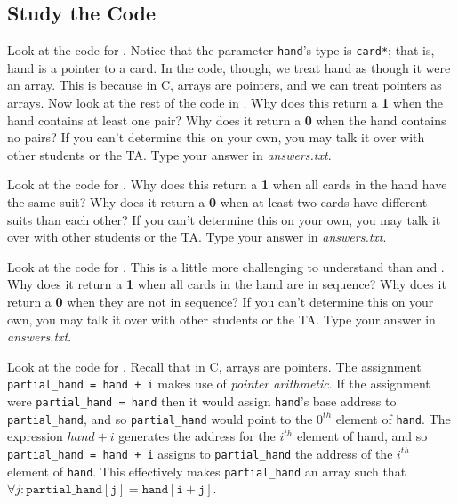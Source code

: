 \subsection{Study the Code} \label{subsec:studythecode}

Look at the code for .
Notice that the parameter \lstinline{hand}'s type is \lstinline{card*}; that is, \lstinline{}{hand} is a pointer to a \lstinline{}{card}.
In the code, though, we treat \lstinline{}{hand} as though it were an array.
This is because in C, arrays are pointers, and we can treat pointers as arrays.
Now look at the rest of the code in .
Why does this return a \textbf{1} when the hand contains at least one pair?
Why does it return a \textbf{0} when the hand contains no pairs?
If you can't determine this on your own, you may talk it over with other students or the TA. Type your answer in \textit{answers.txt}.

Look at the code for .
Why does this return a \textbf{1} when all cards in the hand have the same suit?
Why does it return a \textbf{0} when at least two cards have different suits than each other?
If you can't determine this on your own, you may talk it over with other students or the TA. Type your answer in \textit{answers.txt}.

Look at the code for .
This is a little more challenging to understand than  and .
Why does it return a \textbf{1} when all cards in the hand are in sequence?
Why does it return a \textbf{0} when they are not in sequence?
If you can't determine this on your own, you may talk it over with other students or the TA. Type your answer in \textit{answers.txt}.

Look at the code for .
Recall that in C, arrays are pointers.
The assignment \lstinline{partial_hand = hand + i} makes use of \textit{pointer arithmetic}.
If the assignment were \lstinline{partial_hand = hand} then it would assign \lstinline{hand}'s base address to \lstinline{partial_hand}, and so \lstinline{partial_hand} would point to the $0^{th}$ element of \lstinline{hand}.
The expression $hand+i$ generates the address for the $i^{th}$ element of \lstinline{}{hand}, and so \lstinline{partial_hand = hand + i} assigns to \lstinline{partial_hand} the address of the $i^{th}$ element of \lstinline{hand}.
This effectively makes \lstinline{partial_hand} an array such that $\forall j : \mathtt{partial\_hand[j] = hand[i+j]}$.

